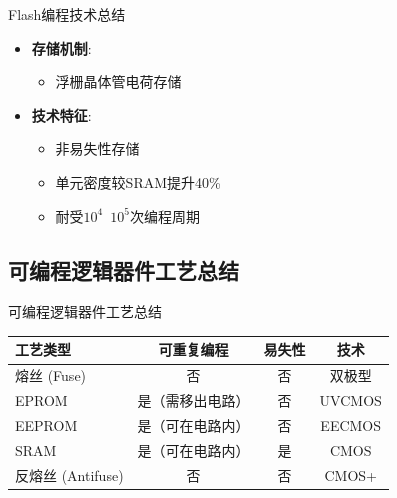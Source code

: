 \begin{frame}{Flash编程技术总结}
\label{flashux7f16ux7a0bux6280ux672fux603bux7ed3}
\begin{itemize}
\tightlist
\item
    \textbf{存储机制}:

    \begin{itemize}
    \tightlist
    \item
    浮栅晶体管电荷存储
    \end{itemize}
\item
    \textbf{技术特征}:

    \begin{itemize}
    \tightlist
    \item
    非易失性存储\\
    \item
    单元密度较SRAM提升40\%\\
    \item
    耐受$10^4$~$10^5$次编程周期
    \end{itemize}
\end{itemize}
\end{frame}

\subsection{可编程逻辑器件工艺总结}
\begin{frame}{可编程逻辑器件工艺总结}
    \begin{table}[h!]
    \centering
    \begin{tabular}{|l|c|c|c|}
    \hline
    \textbf{工艺类型} & \textbf{可重复编程} & \textbf{易失性} & \textbf{技术} \\ \hline
    熔丝 (Fuse) & 否 & 否 & 双极型 \\ \hline
    EPROM & 是（需移出电路） & 否 & UVCMOS \\ \hline
    EEPROM & 是（可在电路内） & 否 & EECMOS \\ \hline
    SRAM & 是（可在电路内） & 是 & CMOS \\ \hline
    反熔丝 (Antifuse) & 否 & 否 & CMOS+ \\ \hline
    \end{tabular}
    \end{table}
\end{frame}